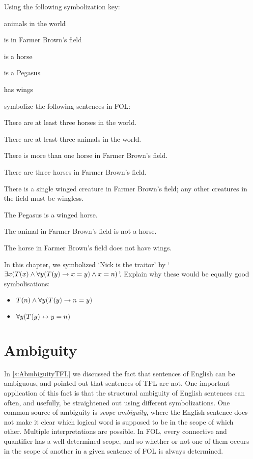 \problempart Using the following symbolization key:
\begin{ekey}
\item[\text{domain}] animals in the world
\item[\atom{B}{x}]  is in Farmer Brown's field
\item[\atom{H}{x}]  is a horse
\item[\atom{P}{x}]  is a Pegasus
\item[\atom{W}{x}]  has wings
\end{ekey}
symbolize the following sentences in FOL:
\begin{compactlist}
\item There are at least three horses in the world.
\item There are at least three animals in the world.
\item There is more than one horse in Farmer Brown's field.
\item There are three horses in Farmer Brown's field.
\item There is a single winged creature in Farmer Brown's field; any other creatures in the field must be wingless.
\item The Pegasus is a winged horse.
\item The animal in Farmer Brown's field is not a horse.
\item The horse in Farmer Brown's field does not have wings.
\end{compactlist}

\problempart
In this chapter, we symbolized `Nick is the traitor' by `$\exists x (T(x) \wedge \forall y(T(y) \rightarrow x = y) \wedge x = n)$'. Explain why these would be equally good symbolisations:
	\begin{itemize}
		\item $T(n) \wedge \forall y(T(y) \rightarrow n = y)$
		\item $\forall y(T(y) \leftrightarrow y = n)$
	\end{itemize}


\chapter{Ambiguity}\label{s:ambiguityFOL}

In \cref{s:AbmbiguityTFL} we discussed the fact that sentences of English can be ambiguous, and pointed out that sentences of TFL are not. One important application of this fact is that the structural ambiguity of English sentences can often, and usefully, be straightened out using different symbolizations.  One common source of ambiguity is \emph{scope ambiguity}, where the English sentence does not make it clear which logical word is supposed to be in the scope of which other. Multiple interpretations are possible.  In FOL, every connective and quantifier has a well-determined scope, and so whether or not one of them occurs in the scope of another in a given sentence of FOL is always determined.

